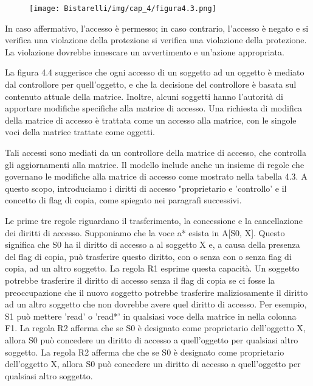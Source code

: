 \begin{figure}[H]
	\centering
    \texttt{[image: Bistarelli/img/cap\_4/figura4.3.png]}
\end{figure}

In caso affermativo, l'accesso è permesso; in caso contrario, l'accesso è negato e si verifica una violazione della protezione si verifica una violazione della protezione. La violazione dovrebbe innescare un avvertimento e un'azione appropriata.

\singlespacing

La figura 4.4 suggerisce che ogni accesso di un soggetto ad un oggetto è mediato dal controllore per quell'oggetto, e che la decisione del controllore è basata sul contenuto attuale della matrice. Inoltre, alcuni soggetti hanno l'autorità di apportare modifiche specifiche alla matrice di accesso. Una richiesta di modifica della matrice di accesso è trattata come un accesso alla matrice, con le singole voci della matrice trattate come oggetti.

\singlespacing

Tali accessi sono mediati da un controllore della matrice di accesso, che controlla gli aggiornamenti alla matrice. Il modello include anche un insieme di regole che governano le modifiche alla matrice di accesso come mostrato nella tabella 4.3. A questo scopo, introduciamo i diritti di accesso "proprietario e 'controllo' e il concetto di flag di copia, come spiegato nei paragrafi successivi.

\singlespacing

Le prime tre regole riguardano il trasferimento, la concessione e la cancellazione dei diritti di accesso. Supponiamo che la voce a* esista in A[S0, X]. Questo significa che S0 ha il diritto di accesso a al soggetto X e, a causa della presenza del flag di copia, può trasferire questo diritto, con o senza con o senza flag di copia, ad un altro soggetto. La regola R1 esprime questa capacità. Un soggetto potrebbe trasferire il diritto di accesso senza il flag di copia se ci fosse la preoccupazione che il nuovo soggetto potrebbe trasferire maliziosamente il diritto ad un altro soggetto che non dovrebbe avere quel diritto di accesso. Per esempio, S1 può mettere 'read' o 'read*' in qualsiasi voce della matrice in nella colonna F1. La regola R2 afferma che se S0 è designato come proprietario dell'oggetto X, allora S0 può concedere un diritto di accesso a quell'oggetto per qualsiasi altro soggetto. La regola R2 afferma che che se S0 è designato come proprietario dell'oggetto X, allora S0 può concedere un diritto di accesso a quell'oggetto per qualsiasi altro soggetto.

